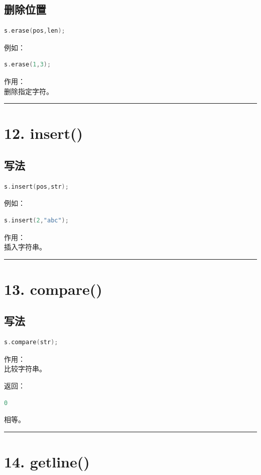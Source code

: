\documentclass[9pt,twocolumn]{extarticle}
\begin{document}
\subsection{删除位置}
\begin{lstlisting}[language=C++]
s.erase(pos,len);
\end{lstlisting}
例如：
\begin{lstlisting}[language=C++]
s.erase(1,3);
\end{lstlisting}
作用：\\
删除指定字符。

\noindent\rule{\linewidth}{0.4pt}

\section{12. insert()}

\subsection{写法}
\begin{lstlisting}[language=C++]
s.insert(pos,str);
\end{lstlisting}
例如：
\begin{lstlisting}[language=C++]
s.insert(2,"abc");
\end{lstlisting}
作用：\\
插入字符串。

\noindent\rule{\linewidth}{0.4pt}

\section{13. compare()}

\subsection{写法}
\begin{lstlisting}[language=C++]
s.compare(str);
\end{lstlisting}
作用：\\
比较字符串。

返回：
\begin{lstlisting}[language=C++]
0
\end{lstlisting}
相等。

\noindent\rule{\linewidth}{0.4pt}

\section{14. getline()}
\end{document}
